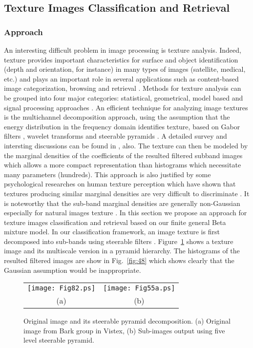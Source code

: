 \documentclass[journal,10pt]{elsart}
\begin{document}
\subsection{Texture Images Classification and Retrieval}
\subsubsection{Approach}
An interesting difficult problem in image processing is texture analysis.
Indeed, texture provides important characteristics for surface and object identification (depth and orientation, for instance) in many types of images (satellite, medical, etc.)
and plays an important role in several applications such as content-based image categorization, browsing and retrieval \cite{Ma1996}.
Methods for texture analysis can be grouped into four major categories:
statistical, geometrical, model based and signal processing approaches \cite{Jain1998}.
An efficient technique for analyzing image textures is the multichannel decomposition approach,
using the assumption that the energy distribution in the frequency domain identifies texture,
based on Gabor filters \cite{Bovik1990,Dunn1994,Dunn1995,Simona2002}, wavelet transforms \cite{Chang1993,Laine1993,Unser1995,Wouwer1999} and steerable pyramids \cite{Freeman1991,Simoncelli1995,Wu2003}.
A detailed survey and intersting discussions can be found in \cite{Randen1999}, also.
The texture can then be modeled by the marginal densities of the coefficients of the resulted filtered subband images which allows a more compact
representation than histograms which necessitate many parameters (hundreds).
This approach is also justified by some psychological researches on human texture perception which have shown that textures producing
similar marginal densities are very difficult to discriminate \cite{Do2002}.
It is noteworthy that the sub-band marginal densities are generally non-Gaussian especially for natural images texture \cite{Simoncelli2000}.
In this section we propose an
approach for texture images classification and retrieval based on our finite general Beta mixture model. In our classification framework, an image texture
is first decomposed into sub-bands using steerable filters \cite{Freeman1991,Simoncelli1995}.
Figure~\ref{fig:47} shows a texture image and its multiscale version in a
pyramid hierarchy. The histograms of the resulted filtered images are show in Fig.~\ref{fig:48} which shows clearly that the Gaussian assumption
would be inappropriate.
\begin{figure}[!h]
\begin{center}
\begin{tabular}{c c}
\texttt{[image: Fig82.ps]}&\texttt{[image: Fig55a.ps]}\\
(a)&(b)
\end{tabular}
\end{center}
\caption{Original image and its steerable pyramid decomposition. (a) Original image from Bark group in Vistex, (b) Sub-images output using five level steerable pyramid.}\label{fig:47}
\end{figure}
\end{document}
